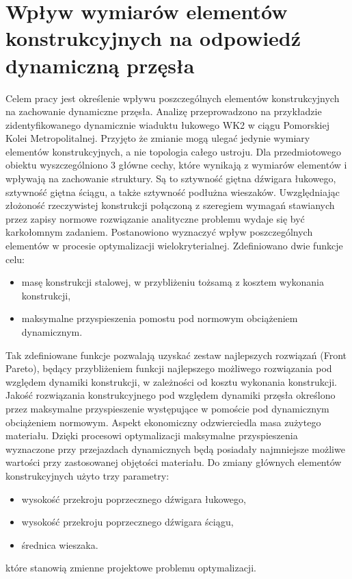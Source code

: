 \section{Wpływ wymiarów elementów konstrukcyjnych na odpowiedź dynamiczną przęsła}
Celem pracy jest określenie wpływu poszczególnych elementów konstrukcyjnych na zachowanie dynamiczne przęsła. Analizę przeprowadzono na przykładzie zidentyfikowanego dynamicznie wiaduktu łukowego WK2 w ciągu Pomorskiej Kolei Metropolitalnej. Przyjęto że zmianie mogą ulegać jedynie wymiary elementów konstrukcyjnych, a nie topologia całego ustroju. Dla przedmiotowego obiektu wyszczególniono 3 główne cechy, które wynikają z wymiarów elementów i wpływają na zachowanie struktury. Są to sztywność giętna dźwigara łukowego, sztywność giętna ściągu, a także sztywność podłużna wieszaków. Uwzględniając złożoność rzeczywistej konstrukcji połączoną z szeregiem wymagań stawianych przez zapisy normowe rozwiązanie analityczne problemu wydaje się być karkołomnym zadaniem. Postanowiono wyznaczyć wpływ poszczególnych elementów w procesie optymalizacji wielokryterialnej. Zdefiniowano dwie funkcje celu:
\begin{itemize}
	\item masę konstrukcji stalowej, w przybliżeniu tożsamą z kosztem wykonania konstrukcji,
	\item maksymalne przyspieszenia pomostu pod normowym obciążeniem dynamicznym.
\end{itemize}
Tak zdefiniowane funkcje pozwalają uzyskać zestaw najlepszych rozwiązań (Front Pareto), będący przybliżeniem funkcji najlepszego możliwego rozwiązania pod względem dynamiki konstrukcji, w zależności od kosztu wykonania konstrukcji. Jakość rozwiązania konstrukcyjnego pod względem dynamiki przęsła określono przez maksymalne przyspieszenie występujące w pomoście pod dynamicznym obciążeniem normowym. Aspekt ekonomiczny odzwierciedla masa zużytego materiału. Dzięki procesowi optymalizacji maksymalne przyspieszenia wyznaczone przy przejazdach dynamicznych będą posiadały najmniejsze możliwe wartości przy zastosowanej objętości materiału. Do zmiany głównych elementów konstrukcyjnych użyto trzy parametry:
\begin{itemize}
	\item wysokość przekroju poprzecznego dźwigara łukowego,
	\item wysokość przekroju poprzecznego dźwigara ściągu,
	\item średnica wieszaka.
\end{itemize}
które stanowią zmienne projektowe problemu optymalizacji.
